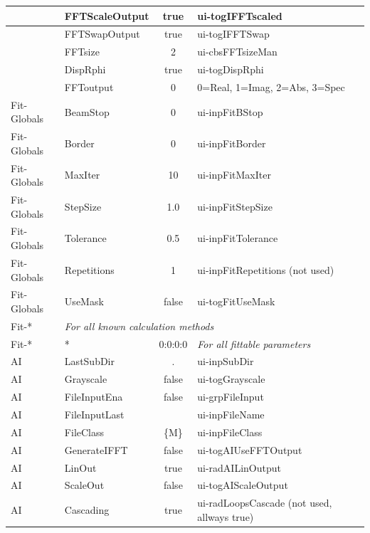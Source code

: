 \documentclass[11pt]{article} %
\begin{document}
\begin{longtable}{|l|l|c|l|}
 & FFTScaleOutput & true & ui-togIFFTscaled \\ \hline
 & FFTSwapOutput & true & ui-togIFFTSwap \\ \hline
 & FFTsize & 2 & ui-cbsFFTsizeMan \\ \hline
 & DispRphi & true & ui-togDispRphi \\ \hline
 & FFToutput & 0 & 0=Real, 1=Imag, 2=Abs, 3=Spec \\ \hline
Fit-Globals & BeamStop & 0 & ui-inpFitBStop \\ \hline
Fit-Globals & Border & 0 & ui-inpFitBorder \\ \hline
Fit-Globals & MaxIter & 10 & ui-inpFitMaxIter \\ \hline
Fit-Globals & StepSize & 1.0 & ui-inpFitStepSize \\ \hline
Fit-Globals & Tolerance & 0.5 & ui-inpFitTolerance \\ \hline
Fit-Globals & Repetitions & 1 & ui-inpFitRepetitions (not used) \\ \hline
Fit-Globals & UseMask & false & ui-togFitUseMask \\ \hline
Fit-* & \multicolumn{3}{l|}{\it For all known calculation methods} \\ \hline
Fit-* & * & 0:0:0:0 & {\it For all fittable parameters} \\ \hline
AI & LastSubDir & . & ui-inpSubDir \\ \hline
AI & Grayscale & false & ui-togGrayscale \\ \hline
AI & FileInputEna & false & ui-grpFileInput \\ \hline
AI & FileInputLast & & ui-inpFileName \\ \hline
AI & FileClass & \{M\} & ui-inpFileClass \\ \hline
AI & GenerateIFFT & false & ui-togAIUseFFTOutput \\ \hline
AI & LinOut & true & ui-radAILinOutput \\ \hline
AI & ScaleOut & false & ui-togAIScaleOutput \\ \hline
AI & Cascading & true & ui-radLoopsCascade (not used, allways true) \\ \hline

\end{longtable}
\end{document}
